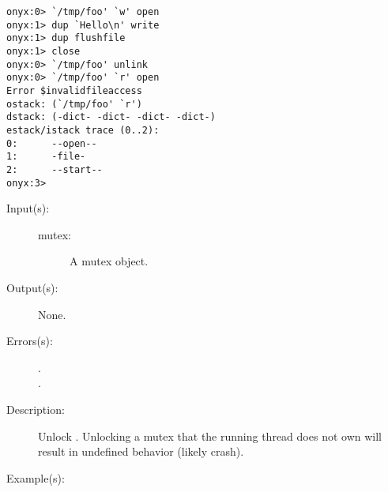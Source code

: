 \begin{description}
\begin{description}
\begin{verbatim}
onyx:0> `/tmp/foo' `w' open
onyx:1> dup `Hello\n' write
onyx:1> dup flushfile
onyx:1> close
onyx:0> `/tmp/foo' unlink
onyx:0> `/tmp/foo' `r' open
Error $invalidfileaccess
ostack: (`/tmp/foo' `r')
dstack: (-dict- -dict- -dict- -dict-)
estack/istack trace (0..2):
0:      --open--
1:      -file-
2:      --start--
onyx:3>
		\end{verbatim}
	\end{description}
\label{systemdict:unlock}
\item[{\onyxop{mutex}{unlock}{--}}: ]
	\begin{description}\item[]
	\item[Input(s): ]
		\begin{description}\item[]
		\item[mutex: ]
			A mutex object.
		\end{description}
	\item[Output(s): ] None.
	\item[Errors(s): ]
		\begin{description}\item[]
		\item[.]
		\item[.]
		\end{description}
	\item[Description: ]
		Unlock .  Unlocking a mutex that the running thread
		does not own will result in undefined behavior (likely crash).
	\item[Example(s): ]\begin{verbatim}


\end{verbatim}
\end{description}
\end{description}
